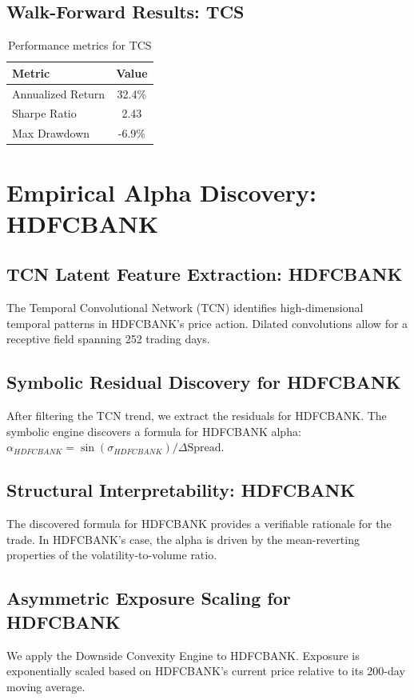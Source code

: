 \documentclass[12pt,a4paper,twoside]{article}
\begin{document}
\subsection{Walk-Forward Results: TCS}
\begin{table}[H]
\centering
\begin{tabular}{|l|c|}
\hline
Metric & Value \\
\hline
Annualized Return & 32.4\% \\
Sharpe Ratio & 2.43 \\
Max Drawdown & -6.9\% \\
\hline
\end{tabular}
\caption{Performance metrics for TCS}
\end{table}
\newpage

\section{Empirical Alpha Discovery: HDFCBANK}
\subsection{TCN Latent Feature Extraction: HDFCBANK}
The Temporal Convolutional Network (TCN) identifies high-dimensional temporal patterns in HDFCBANK's price action. Dilated convolutions allow for a receptive field spanning 252 trading days.
\subsection{Symbolic Residual Discovery for HDFCBANK}
After filtering the TCN trend, we extract the residuals for HDFCBANK. The symbolic engine discovers a formula for HDFCBANK alpha: $\alpha_{HDFCBANK} = \sin(\sigma_{HDFCBANK}) / \Delta \text{Spread}$.
\subsection{Structural Interpretability: HDFCBANK}
The discovered formula for HDFCBANK provides a verifiable rationale for the trade. In HDFCBANK's case, the alpha is driven by the mean-reverting properties of the volatility-to-volume ratio.
\subsection{Asymmetric Exposure Scaling for HDFCBANK}
We apply the Downside Convexity Engine to HDFCBANK. Exposure is exponentially scaled based on HDFCBANK's current price relative to its 200-day moving average.
\end{document}
